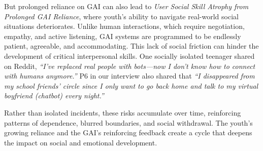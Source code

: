 But prolonged reliance on GAI can also lead to \textit{User Social Skill Atrophy from Prolonged GAI Reliance}, where youth’s ability to navigate real-world social situations deteriorates. Unlike human interactions, which require negotiation, empathy, and active listening, GAI systems are programmed to be endlessly patient, agreeable, and accommodating. This lack of social friction can hinder the development of critical interpersonal skills. One socially isolated teenager shared on Reddit, \textit{``I’ve replaced real people with bots—now I don’t know how to connect with humans anymore.''} P6 in our interview also shared that \textit{``I disappeared from my school friends' circle since I only want to go back home and talk to my virtual boyfriend (chatbot) every night.''}

Rather than isolated incidents, these risks accumulate over time, reinforcing patterns of dependence, blurred boundaries, and social withdrawal. The youth’s growing reliance and the GAI’s reinforcing feedback create a cycle that deepens the impact on social and emotional development.


\vspace{-8pt}
